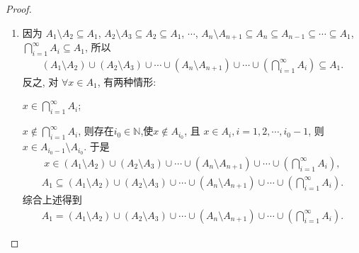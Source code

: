 \documentclass[../../main.tex]{subfiles}%
\begin{document}
\begin{proof}
\begin{enumerate}[(1)]
{\color{blue}证法二(归纳法):}当 $n=1$ 时, 有
\begin{align*}
\bigcup_{i=1}^{1} A_i = A_1 = B_1 = \bigcup_{i=1}^{1} B_i.
\end{align*}
假设 $n=k$ 时, 有 $\bigcup_{i=1}^{k} A_i = \bigcup_{i=1}^{k} B_i$, 则
\begin{align*}
\bigcup_{i=1}^{k+1} B_i = B_{k+1} \cup \left( \bigcup_{i=1}^{k} B_i \right) = \left( A_{k+1} \setminus \bigcup_{i=1}^{k} A_i \right) \cup \left( \bigcup_{i=1}^{k} A_i \right) = \bigcup_{i=1}^{k+1} A_i.
\end{align*}
因此, 对 $\forall n \in \mathbb{N}$, 有 $\bigcup_{i=1}^{n} A_i = \bigcup_{i=1}^{n} B_i$.

再证 $\bigcup_{i=1}^{\infty} A_i = \bigcup_{i=1}^{\infty} B_i$. 事实上, 由
\begin{align*}
A_i \subseteq \bigcup_{j=1}^{i} A_j = \bigcup_{j=1}^{i} B_j \subseteq \bigcup_{j=1}^{\infty} B_j = \bigcup_{i=1}^{\infty} B_i,
\end{align*}
故 $\bigcup_{i=1}^{\infty} A_i \subseteq \bigcup_{i=1}^{\infty} B_i$. 同理, $\bigcup_{i=1}^{\infty} B_i \subseteq \bigcup_{i=1}^{\infty} A_i$. (或者由 $B_i = A_i \setminus \bigcup_{j=1}^{i} A_j \subseteq A_i$ 推得上式). 于是
\begin{align*}
\bigcup_{i=1}^{\infty} A_i = \bigcup_{i=1}^{\infty} B_i.
\end{align*}

\item 因为 $A_1 \setminus A_2 \subseteq A_1$, $A_2 \setminus A_3 \subseteq A_2 \subseteq A_1$, $\cdots$, $A_n \setminus A_{n+1} \subseteq A_n \subseteq A_{n-1} \subseteq \cdots \subseteq A_1$, $\bigcap_{i=1}^{\infty} A_i \subseteq A_1$, 所以
\begin{align*}
(A_1 \setminus A_2) \cup (A_2 \setminus A_3) \cup \cdots \cup (A_n \setminus A_{n+1}) \cup \cdots \cup \left( \bigcap_{i=1}^{\infty} A_i \right) \subseteq A_1.
\end{align*}
反之, 对 $\forall x \in A_1$, 有两种情形:

\one $x \in \bigcap_{i=1}^{\infty} A_i$;

\two $x \notin \bigcap_{i=1}^{\infty} A_i$, 则存在$i_0\in \mathbb{N}$,使$x \notin A_{i_0}$, 且 $x \in A_i, i=1,2,\cdots,i_0-1$, 则 $x \in A_{i_0-1} \setminus A_{i_0}$. 于是
\begin{align*}
x \in (A_1 \setminus A_2) \cup (A_2 \setminus A_3) \cup \cdots \cup (A_n \setminus A_{n+1}) \cup \cdots \cup \left( \bigcap_{i=1}^{\infty} A_i \right),
\end{align*}
\begin{align*}
A_1 \subseteq (A_1 \setminus A_2) \cup (A_2 \setminus A_3) \cup \cdots \cup (A_n \setminus A_{n+1}) \cup \cdots \cup \left( \bigcap_{i=1}^{\infty} A_i \right).
\end{align*}
综合上述得到
\begin{align*}
A_1 = (A_1 \setminus A_2) \cup (A_2 \setminus A_3) \cup \cdots \cup (A_n \setminus A_{n+1}) \cup \cdots \cup \left( \bigcap_{i=1}^{\infty} A_i \right).
\end{align*}


\end{enumerate}
\end{proof}
\end{document}
